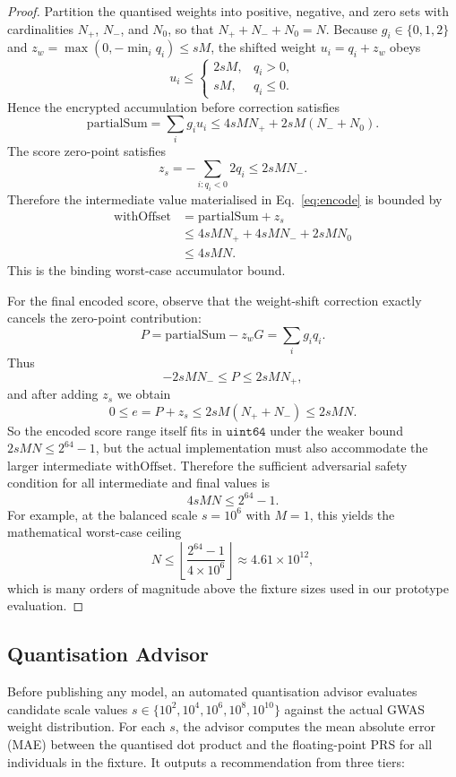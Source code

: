 \documentclass[10pt,twocolumn]{article}
\begin{document}
{\renewcommand{\qedsymbol}{}
\begin{proof}
Partition the quantised weights into positive, negative, and zero sets with
cardinalities $N_{+}$, $N_{-}$, and $N_{0}$, so that $N_{+}+N_{-}+N_{0}=N$.
Because $g_i \in \{0,1,2\}$ and $z_w=\max(0,-\min_i q_i) \leq sM$, the shifted weight
$u_i = q_i + z_w$ obeys
\[
u_i \leq
\begin{cases}
2 s M, & q_i > 0,\\
s M, & q_i \leq 0.
\end{cases}
\]
Hence the encrypted accumulation before correction satisfies
\[
\mathrm{partialSum} = \sum_i g_i u_i
\leq 4 s M N_{+} + 2 s M (N_{-}+N_{0}).
\]
The score zero-point satisfies
\[
z_s = -\sum_{i:q_i<0} 2 q_i \leq 2 s M N_{-}.
\]
Therefore the intermediate value materialised in Eq.~\ref{eq:encode} is bounded by
\begin{align*}
\mathrm{withOffset} &= \mathrm{partialSum} + z_s \\
&\leq 4sMN_{+}+4sMN_{-}+2sMN_{0} \\
&\leq 4sMN.
\end{align*}
This is the binding worst-case accumulator bound.

For the final encoded score, observe that the weight-shift correction exactly
cancels the zero-point contribution:
\[
P = \mathrm{partialSum} - z_w G = \sum_i g_i q_i.
\]
Thus
\[
-2 s M N_{-} \leq P \leq 2 s M N_{+},
\]
and after adding $z_s$ we obtain
\[
0 \leq e = P + z_s \leq 2 s M (N_{+}+N_{-}) \leq 2 s M N.
\]
So the encoded score range itself fits in $\texttt{uint64}$ under the weaker bound
$2 s M N \leq 2^{64}-1$, but the actual implementation must also accommodate the
larger intermediate $\mathrm{withOffset}$.  Therefore the sufficient adversarial
safety condition for all intermediate and final values is
\[
4 s M N \leq 2^{64}-1.
\]
For example, at the balanced scale $s=10^{6}$ with $M=1$, this yields the
mathematical worst-case ceiling
\[
N \leq \left\lfloor \frac{2^{64}-1}{4\times 10^6} \right\rfloor
\approx 4.61 \times 10^{12},
\]
which is many orders of magnitude above the fixture sizes used in our prototype
evaluation.
\end{proof}}

\subsection{Quantisation Advisor}
\label{sec:advisor}

Before publishing any model, an automated quantisation advisor evaluates candidate
scale values $s \in \{10^2, 10^4, 10^6, 10^8, 10^{10}\}$ against the actual GWAS
weight distribution.  For each $s$, the advisor computes the mean absolute error
(MAE) between the quantised dot product and the floating-point PRS for all
individuals in the fixture.  It outputs a recommendation from three tiers:
\end{document}
